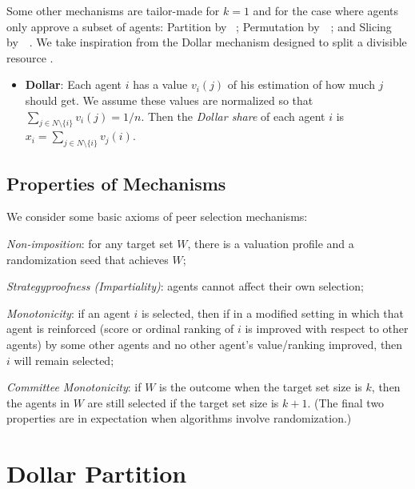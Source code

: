 \documentclass[letterpaper]{article}
\newcommand{\citet}[1]{\citeauthor{#1}~\shortcite{#1}}
\begin{document}
Some other mechanisms are tailor-made for $k=1$ and for the case where agents only approve a subset of agents: Partition by \citet{HoMo13a}; Permutation by~\citet{FeKl14a}; and Slicing by~\citet{BNV14a}.
We take inspiration from the Dollar mechanism designed to split a divisible resource \cite{CMT08a}.



\begin{itemize}
\item \textbf{Dollar}: Each agent $i$ has a value $v_{i}(j)$ of his estimation of how much $j$ should get. We assume these values are normalized so that $\sum_{j\in N\setminus \{i\}}v_i(j)=1/n$. Then the \emph{Dollar share} of each agent $i$ is $x_i=\sum_{j\in N\setminus \{i\}}v_j(i)$.
\end{itemize}








\subsection{Properties of Mechanisms}

We consider some basic axioms of peer selection mechanisms:
\begin{inparaenum}[(i)]
\item \emph{Non-imposition}: for any target set $W$, there is a valuation profile and a randomization seed that achieves $W$;
\item \emph{Strategyproofness (Impartiality)}: agents cannot affect their own selection;
\item \emph{Monotonicity}: if an agent $i$ is selected, then if in a modified setting in which that agent is reinforced (score or ordinal ranking of $i$ is improved with respect to other agents) by some other agents and no other agent's value/ranking improved, then $i$ will remain selected;
\item \emph{Committee Monotonicity}: if $W$ is the outcome when the target set size is $k$, then the agents in $W$ are still selected if the target set size is $k+1$. (The final two properties are in expectation when algorithms involve randomization.)
\end{inparaenum}




\section{Dollar Partition}
\end{document}
